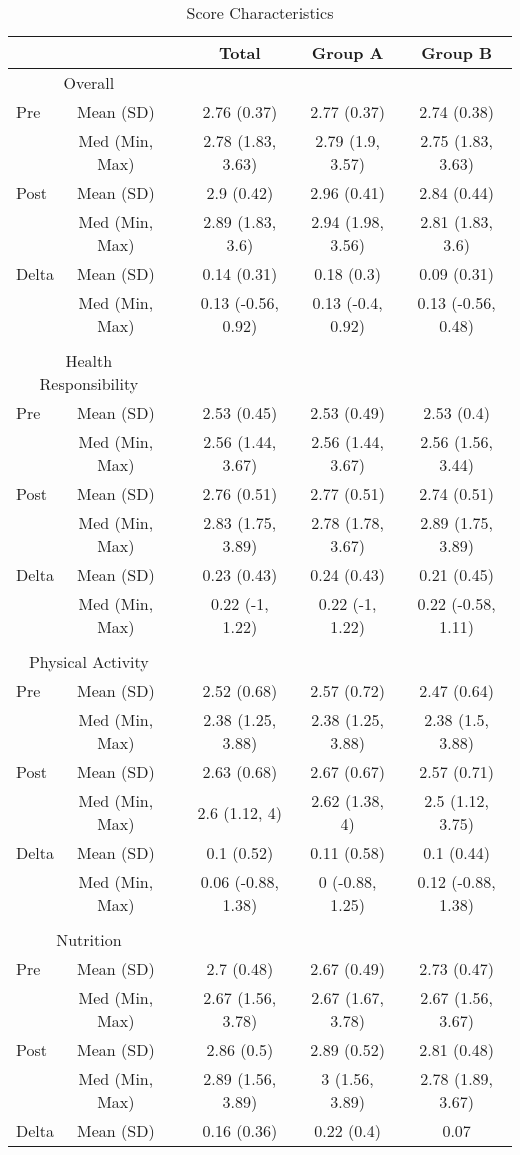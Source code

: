 \documentclass[]{article}
\begin{document}
\begin{table}[hbt]
\centering
\caption{Score Characteristics}
\begin{tabular}{l c  p{0.001cm} | c c c }
&&& Total & Group A & Group B \\
\hline
\multicolumn{2}{c}{ Overall } &&\\ Pre  & Mean (SD) &  & 2.76 (0.37) & 2.77 (0.37) & 2.74 (0.38) \\& Med (Min, Max) &  & 2.78 (1.83, 3.63) & 2.79 (1.9, 3.57) & 2.75 (1.83, 3.63) \\Post  & Mean (SD) &  & 2.9 (0.42) & 2.96 (0.41) & 2.84 (0.44) \\& Med (Min, Max) &  & 2.89 (1.83, 3.6) & 2.94 (1.98, 3.56) & 2.81 (1.83, 3.6) \\Delta  & Mean (SD) &  & 0.14 (0.31) & 0.18 (0.3) & 0.09 (0.31) \\& Med (Min, Max) &  & 0.13 (-0.56, 0.92) & 0.13 (-0.4, 0.92) & 0.13 (-0.56, 0.48) \\&&\\\multicolumn{2}{c}{ Health Responsibility } &&\\ Pre  & Mean (SD) &  & 2.53 (0.45) & 2.53 (0.49) & 2.53 (0.4) \\& Med (Min, Max) &  & 2.56 (1.44, 3.67) & 2.56 (1.44, 3.67) & 2.56 (1.56, 3.44) \\Post  & Mean (SD) &  & 2.76 (0.51) & 2.77 (0.51) & 2.74 (0.51) \\& Med (Min, Max) &  & 2.83 (1.75, 3.89) & 2.78 (1.78, 3.67) & 2.89 (1.75, 3.89) \\Delta  & Mean (SD) &  & 0.23 (0.43) & 0.24 (0.43) & 0.21 (0.45) \\& Med (Min, Max) &  & 0.22 (-1, 1.22) & 0.22 (-1, 1.22) & 0.22 (-0.58, 1.11) \\&&\\\multicolumn{2}{c}{ Physical Activity } &&\\ Pre  & Mean (SD) &  & 2.52 (0.68) & 2.57 (0.72) & 2.47 (0.64) \\& Med (Min, Max) &  & 2.38 (1.25, 3.88) & 2.38 (1.25, 3.88) & 2.38 (1.5, 3.88) \\Post  & Mean (SD) &  & 2.63 (0.68) & 2.67 (0.67) & 2.57 (0.71) \\& Med (Min, Max) &  & 2.6 (1.12, 4) & 2.62 (1.38, 4) & 2.5 (1.12, 3.75) \\Delta  & Mean (SD) &  & 0.1 (0.52) & 0.11 (0.58) & 0.1 (0.44) \\& Med (Min, Max) &  & 0.06 (-0.88, 1.38) & 0 (-0.88, 1.25) & 0.12 (-0.88, 1.38) \\&&\\\multicolumn{2}{c}{ Nutrition } &&\\ Pre  & Mean (SD) &  & 2.7 (0.48) & 2.67 (0.49) & 2.73 (0.47) \\& Med (Min, Max) &  & 2.67 (1.56, 3.78) & 2.67 (1.67, 3.78) & 2.67 (1.56, 3.67) \\Post  & Mean (SD) &  & 2.86 (0.5) & 2.89 (0.52) & 2.81 (0.48) \\& Med (Min, Max) &  & 2.89 (1.56, 3.89) & 3 (1.56, 3.89) & 2.78 (1.89, 3.67) \\Delta  & Mean (SD) &  & 0.16 (0.36) & 0.22 (0.4) & 0.07 
\end{tabular}
\end{table}
\end{document}
